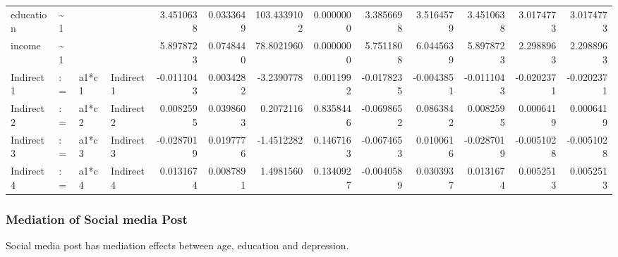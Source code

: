 \documentclass[
]{article}
\begin{document}
\begin{table}[!h]
\begin{tabular}[t]{llllrrrrrrrrr}
\addlinespace
education & \textasciitilde{}1 &  &  & 3.4510638 & 0.0333649 & 103.4339102 & 0.0000000 & 3.3856698 & 3.5164579 & 3.4510638 & 3.0174773 & 3.0174773\\
income & \textasciitilde{}1 &  &  & 5.8978723 & 0.0748440 & 78.8021960 & 0.0000000 & 5.7511808 & 6.0445639 & 5.8978723 & 2.2988963 & 2.2988963\\
Indirect1 & := & a1*c1 & Indirect1 & -0.0111043 & 0.0034282 & -3.2390778 & 0.0011992 & -0.0178235 & -0.0043851 & -0.0111043 & -0.0202371 & -0.0202371\\
Indirect2 & := & a1*c2 & Indirect2 & 0.0082595 & 0.0398603 & 0.2072116 & 0.8358446 & -0.0698652 & 0.0863842 & 0.0082595 & 0.0006419 & 0.0006419\\
Indirect3 & := & a1*c3 & Indirect3 & -0.0287019 & 0.0197776 & -1.4512282 & 0.1467163 & -0.0674653 & 0.0100616 & -0.0287019 & -0.0051028 & -0.0051028\\
\addlinespace
Indirect4 & := & a1*c4 & Indirect4 & 0.0131674 & 0.0087891 & 1.4981560 & 0.1340927 & -0.0040589 & 0.0303937 & 0.0131674 & 0.0052513 & 0.0052513\\
\bottomrule
\end{tabular}
\end{table}

\newpage

\hypertarget{mediation-of-social-media-post}{%
\subsubsection{Mediation of Social media
Post}\label{mediation-of-social-media-post}}

Social media post has mediation effects between age, education and
depression.
\end{document}
